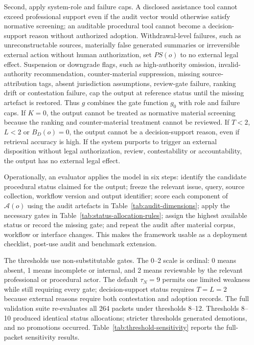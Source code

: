 \documentclass[12pt,a4paper]{article}
\begin{document}
Second, apply system-role and failure caps. A disclosed assistance tool cannot exceed professional support even if the audit vector would otherwise satisfy normative screening; an auditable procedural tool cannot become a decision-support reason without authorized adoption. Withdrawal-level failures, such as unreconstructable sources, materially false generated summaries or irreversible external action without human authorization, set $PS(o)$ to no external legal effect. Suspension or downgrade flags, such as high-authority omission, invalid-authority recommendation, counter-material suppression, missing source-attribution tags, absent jurisdiction assumptions, review-gate failure, ranking drift or contestation failure, cap the output at reference status until the missing artefact is restored. Thus $g$ combines the gate function $g_0$ with role and failure caps. If $K=0$, the output cannot be treated as normative material screening because the ranking and counter-material treatment cannot be reviewed. If $T<2$, $L<2$ or $B_D(o)=0$, the output cannot be a decision-support reason, even if retrieval accuracy is high. If the system purports to trigger an external disposition without legal authorization, review, contestability or accountability, the output has no external legal effect.

Operationally, an evaluator applies the model in six steps: identify the candidate procedural status claimed for the output; freeze the relevant issue, query, source collection, workflow version and output identifier; score each component of $\mathcal{A}(o)$ using the audit artefacts in Table~\ref{tab:audit-dimensions}; apply the necessary gates in Table~\ref{tab:status-allocation-rules}; assign the highest available status or record the missing gate; and repeat the audit after material corpus, workflow or interface changes. This makes the framework usable as a deployment checklist, post-use audit and benchmark extension.

The thresholds use non-substitutable gates. The 0--2 scale is ordinal: 0 means absent, 1 means incomplete or internal, and 2 means reviewable by the relevant professional or procedural actor. The default $\tau_N=9$ permits one limited weakness while still requiring every gate; decision-support status requires $T=L=2$ because external reasons require both contestation and adoption records. The full validation suite re-evaluates all 264 packets under thresholds 8--12. Thresholds 8--10 produced identical status allocations; stricter thresholds generated demotions, and no promotions occurred. Table~\ref{tab:threshold-sensitivity} reports the full-packet sensitivity results.
\end{document}
